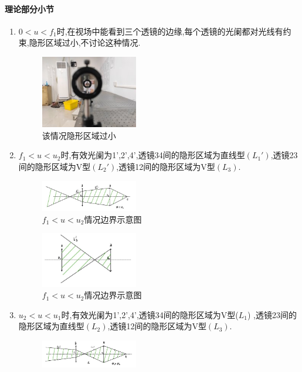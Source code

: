 \documentclass[UTF8]{gapd}
\begin{document}
\paragraph{理论部分小节}
\begin{enumerate}
  \item $0<u<f_1$时,在视场中能看到三个透镜的边缘,每个透镜的光阑都对光线有约束,隐形区域过小,不讨论这种情况.
  \begin{figure}[htbp]
    \centering
    \includegraphics[width=0.4\textwidth]{images/11.jpg}
    \caption{该情况隐形区域过小}
    \label{fig:11}
  \end{figure}
  \item $f_1<u<u_2$时,有效光阑为1',2',4',透镜34间的隐形区域为直线型$(L_1')$,透镜23间的隐形区域为V型$(L_2')$,透镜12间的隐形区域为V型$(L_3)$.
  \begin{figure}[htbp]
    \centering
    \includegraphics[width=0.4\textwidth]{images/12.jpg}
    \caption{$f_1<u<u_2$情况边界示意图}
    \label{fig:12}
  \end{figure}
  \begin{figure}[htbp]
    \centering
    \includegraphics[width=0.4\textwidth]{images/13.jpg}
    \caption{$f_1<u<u_2$情况边界示意图}
    \label{fig:13}
  \end{figure} 
  \item $u_2<u<u_1$时,有效光阑为1',2',4',透镜34间的隐形区域为V型($L_1$) ,透镜23间的隐形区域为直线型$(L_2)$,透镜12间的隐形区域为V型$(L_3)$.
  \begin{figure}[htbp]
    \centering
    \includegraphics[width=0.4\textwidth]{images/14.jpg}

\end{figure}
\end{enumerate}
\end{document}
